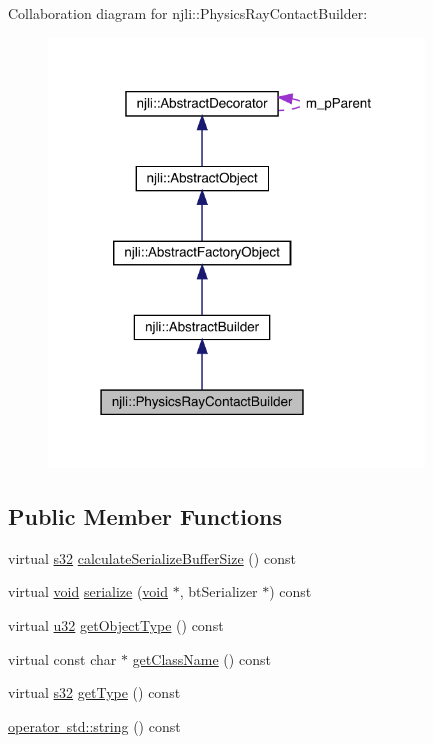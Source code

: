 Collaboration diagram for njli\+:\+:Physics\+Ray\+Contact\+Builder\+:\nopagebreak
\begin{figure}[H]
\begin{center}
\leavevmode
\includegraphics[width=283pt]{classnjli_1_1_physics_ray_contact_builder__coll__graph}
\end{center}
\end{figure}
\subsection*{Public Member Functions}
\begin{DoxyCompactItemize}
\item 
virtual \mbox{\hyperlink{_util_8h_aa62c75d314a0d1f37f79c4b73b2292e2}{s32}} \mbox{\hyperlink{classnjli_1_1_physics_ray_contact_builder_a03827057cf84cb281096ce1935a9a0c9}{calculate\+Serialize\+Buffer\+Size}} () const
\item 
virtual \mbox{\hyperlink{_thread_8h_af1e856da2e658414cb2456cb6f7ebc66}{void}} \mbox{\hyperlink{classnjli_1_1_physics_ray_contact_builder_af11d9c73fa7c074c62fa2e5e01f368d4}{serialize}} (\mbox{\hyperlink{_thread_8h_af1e856da2e658414cb2456cb6f7ebc66}{void}} $\ast$, bt\+Serializer $\ast$) const
\item 
virtual \mbox{\hyperlink{_util_8h_a10e94b422ef0c20dcdec20d31a1f5049}{u32}} \mbox{\hyperlink{classnjli_1_1_physics_ray_contact_builder_ae2ebfa550ff3ac2c6cea079947bea034}{get\+Object\+Type}} () const
\item 
virtual const char $\ast$ \mbox{\hyperlink{classnjli_1_1_physics_ray_contact_builder_a55fed195f3192a411c978c18a21c816a}{get\+Class\+Name}} () const
\item 
virtual \mbox{\hyperlink{_util_8h_aa62c75d314a0d1f37f79c4b73b2292e2}{s32}} \mbox{\hyperlink{classnjli_1_1_physics_ray_contact_builder_a67c24309ad6afc528f4b6aa20b7767e7}{get\+Type}} () const
\item 
\mbox{\hyperlink{classnjli_1_1_physics_ray_contact_builder_ac5d9bcfbc0d3938416fc862576a08a9c}{operator std\+::string}} () const
\end{DoxyCompactItemize}
